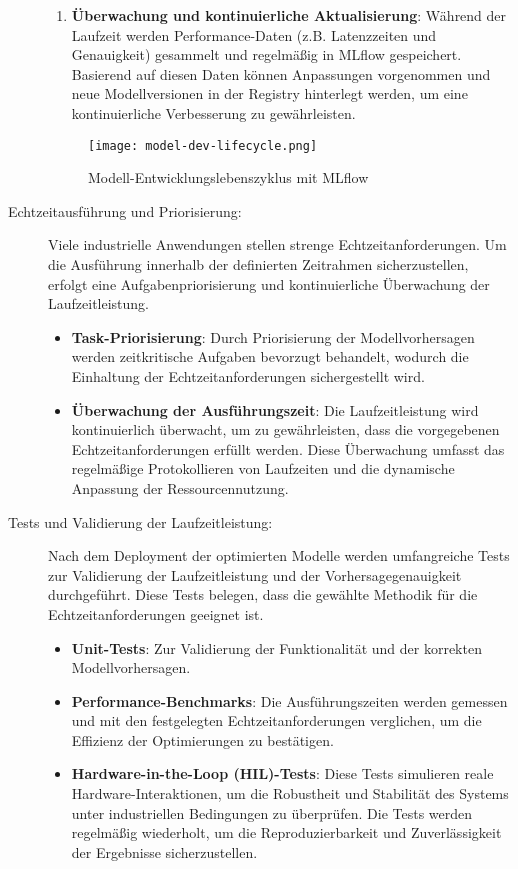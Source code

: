 \begin{description}
\begin{enumerate}
    \item \textbf{Überwachung und kontinuierliche Aktualisierung}:
    Während der Laufzeit werden Performance-Daten (z.B. Latenzzeiten und Genauigkeit) gesammelt und regelmäßig in MLflow gespeichert. Basierend auf diesen Daten können Anpassungen vorgenommen und neue Modellversionen in der Registry hinterlegt werden, um eine kontinuierliche Verbesserung zu gewährleisten.
\end{enumerate}

\begin{figure}[h!]
    \centering
    \texttt{[image: model-dev-lifecycle.png]} 
    \caption{Modell-Entwicklungslebenszyklus mit MLflow \cite{MLFlow}} 
    \label{fig:architecture}
\end{figure}

    \item[Echtzeitausführung und Priorisierung:] Viele industrielle Anwendungen stellen strenge Echtzeitanforderungen. Um die Ausführung innerhalb der definierten 
    Zeitrahmen sicherzustellen, erfolgt eine Aufgabenpriorisierung und kontinuierliche Überwachung der Laufzeitleistung.
    \begin{itemize}
        \item \textbf{Task-Priorisierung}: Durch Priorisierung der Modellvorhersagen werden zeitkritische Aufgaben bevorzugt behandelt, wodurch die Einhaltung der Echtzeitanforderungen sichergestellt wird.
        \item \textbf{Überwachung der Ausführungszeit}: Die Laufzeitleistung wird kontinuierlich überwacht, um zu gewährleisten, dass die vorgegebenen Echtzeitanforderungen erfüllt werden. 
        Diese Überwachung umfasst das regelmäßige Protokollieren von Laufzeiten und die dynamische Anpassung der Ressourcennutzung.
    \end{itemize}
    
    \item[Tests und Validierung der Laufzeitleistung:] Nach dem Deployment der optimierten Modelle werden umfangreiche Tests zur Validierung der Laufzeitleistung und der Vorhersagegenauigkeit durchgeführt. 
    Diese Tests belegen, dass die gewählte Methodik für die Echtzeitanforderungen geeignet ist.
    \begin{itemize}
        \item \textbf{Unit-Tests}: Zur Validierung der Funktionalität und der korrekten Modellvorhersagen.
        \item \textbf{Performance-Benchmarks}: Die Ausführungszeiten werden gemessen und mit den festgelegten Echtzeitanforderungen verglichen, um die Effizienz der Optimierungen zu bestätigen.
        \item \textbf{Hardware-in-the-Loop (HIL)-Tests}: Diese Tests simulieren reale Hardware-Interaktionen, um die Robustheit und Stabilität des Systems unter industriellen Bedingungen zu überprüfen. 
        Die Tests werden regelmäßig wiederholt, um die Reproduzierbarkeit und Zuverlässigkeit der Ergebnisse sicherzustellen.
    \end{itemize}
\end{description}
